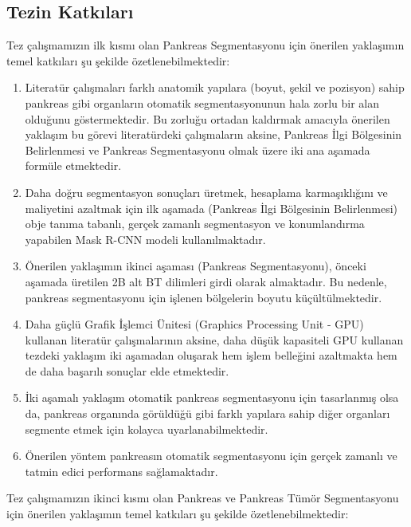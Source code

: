 \subsection{Tezin Katkıları}
Tez çalışmamızın ilk kısmı olan Pankreas Segmentasyonu için önerilen yaklaşımın temel katkıları şu şekilde özetlenebilmektedir:

\begin{enumerate}
	\item Literatür çalışmaları farklı anatomik yapılara (boyut, şekil ve pozisyon) sahip pankreas gibi organların otomatik segmentasyonunun hala zorlu bir alan olduğunu göstermektedir. Bu zorluğu ortadan kaldırmak amacıyla önerilen yaklaşım bu görevi literatürdeki çalışmaların aksine, Pankreas İlgi Bölgesinin Belirlenmesi ve Pankreas Segmentasyonu olmak üzere iki ana aşamada formüle etmektedir.
	\item Daha doğru segmentasyon sonuçları üretmek, hesaplama karmaşıklığını ve maliyetini azaltmak için ilk aşamada (Pankreas İlgi Bölgesinin Belirlenmesi) obje tanıma tabanlı, gerçek zamanlı segmentasyon ve konumlandırma yapabilen Mask R-CNN modeli kullanılmaktadır.
	\item Önerilen yaklaşımın ikinci aşaması (Pankreas Segmentasyonu), önceki aşamada üretilen 2B alt BT dilimleri girdi olarak almaktadır. Bu nedenle, pankreas segmentasyonu için işlenen bölgelerin boyutu küçültülmektedir.
	\item Daha güçlü Grafik İşlemci Ünitesi (Graphics Processing Unit - GPU) kullanan literatür çalışmalarının aksine, daha düşük kapasiteli GPU kullanan tezdeki yaklaşım iki aşamadan oluşarak hem işlem belleğini azaltmakta hem de daha başarılı sonuçlar elde etmektedir.
	\item İki aşamalı yaklaşım otomatik pankreas segmentasyonu için tasarlanmış olsa da, pankreas organında görüldüğü gibi farklı yapılara sahip diğer organları segmente etmek için kolayca uyarlanabilmektedir.
	\item Önerilen yöntem pankreasın otomatik segmentasyonu için gerçek zamanlı ve tatmin edici performans sağlamaktadır.
\end{enumerate}

Tez çalışmamızın ikinci kısmı olan Pankreas ve Pankreas Tümör Segmentasyonu için önerilen yaklaşımın temel katkıları şu şekilde özetlenebilmektedir:

